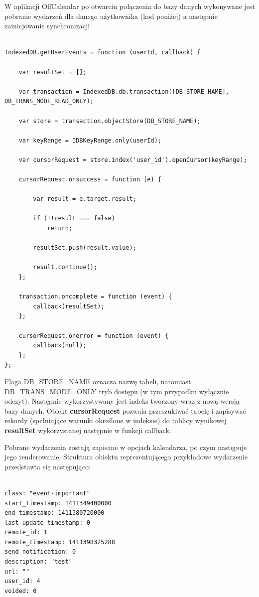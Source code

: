 W aplikacji OffCalendar po otwarciu połączenia do bazy danych wykonywane jest pobranie wydarzeń dla danego użytkownika (kod poniżej) a następnie zainicjowanie synchronizacji

\begin{lstlisting}[caption=Pobranie wydarzeń użytkownika., label=amb, captionpos=b]

IndexedDB.getUserEvents = function (userId, callback) {

    var resultSet = [];

    var transaction = IndexedDB.db.transaction([DB_STORE_NAME], DB_TRANS_MODE_READ_ONLY);

    var store = transaction.objectStore(DB_STORE_NAME);

    var keyRange = IDBKeyRange.only(userId);

    var cursorRequest = store.index('user_id').openCursor(keyRange);

    cursorRequest.onsuccess = function (e) {

        var result = e.target.result;

        if (!!result === false)
            return;

        resultSet.push(result.value);

        result.continue();
    };

    transaction.oncomplete = function (event) {
        callback(resultSet);
    };

    cursorRequest.onerror = function (event) {
        callback(null);
    };
};

\end{lstlisting}

Flaga DB\_STORE\_NAME oznacza nazwę tabeli, natomiast DB\_TRANS\_MODE\_ONLY tryb dostępu (w tym przypadku wyłącznie odczyt). Następnie wykorzystywany jest indeks tworzony wraz z nową wersją bazy danych. Obiekt \textbf{cursorRequest} pozwala przeszukiwać tabelę i zapisywać rekordy (spełniające warunki określone w indeksie) do tablicy wynikowej \textbf{resultSet} wykorzystanej następnie w funkcji callback.

Pobrane wydarzenia zostają zapisane w opcjach kalendarza, po czym następuje jego renderowanie. Struktura obiektu reprezentującego przykładowe wydarzenie przedstawia się następująco:

\begin{lstlisting}[caption=Struktura obiektu reprezentującego wydarzenie., label=amb, captionpos=b]

class: "event-important"
start_timestamp: 1411349400000
end_timestamp: 1411380720000
last_update_timestamp: 0
remote_id: 1
remote_timestamp: 1411398325288
send_notification: 0
description: "test"
url: ""
user_id: 4
voided: 0

\end{lstlisting}

